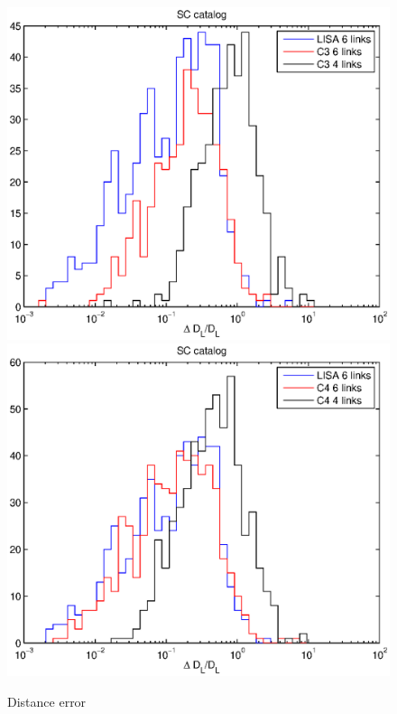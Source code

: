 \documentclass{iopart}
\begin{document}
\begin{figure}[H]
\includegraphics[scale=0.54]{FigSMBHRyanNeil/SCD3.eps}
\includegraphics[scale=0.54]{FigSMBHRyanNeil/SCD4.eps}
\caption{Distance error}
\end{figure}
\end{document}

